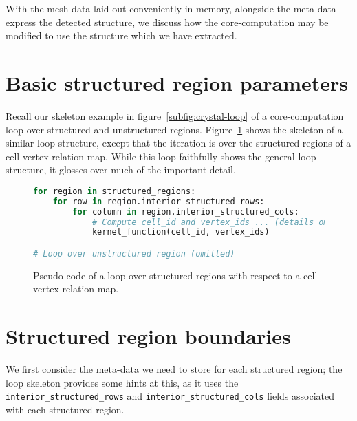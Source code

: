 \label{chap:exploit-structure}

With the mesh data laid out conveniently in memory, alongside the meta-data express the detected structure, we discuss how the core-computation may be modified to use the structure which we have extracted.

\section{Basic structured region parameters}
Recall our skeleton example in figure~\ref{subfig:crystal-loop} of a core-computation loop over structured and unstructured regions. Figure~\ref{fig:skeleton-structured-loop} shows the skeleton of a similar loop structure, except that the iteration is over the structured regions of a cell-vertex relation-map. While this loop faithfully shows the general loop structure, it glosses over much of the important detail.

\begin{figure}
\newsavebox{\thelisting}
\begin{lrbox}{\thelisting}
\begin{lstlisting}[language=python]
for region in structured_regions:
	for row in region.interior_structured_rows:
		for column in region.interior_structured_cols:
			# Compute cell_id and vertex_ids ... (details omitted)
			kernel_function(cell_id, vertex_ids)

# Loop over unstructured region (omitted)
\end{lstlisting}
\end{lrbox}

\usebox{\thelisting}
\caption{Pseudo-code of a loop over structured regions with respect to a cell-vertex relation-map.}
\label{fig:skeleton-structured-loop}
\end{figure}

\section{Structured region boundaries}
We first consider the meta-data we need to store for each structured region; the loop skeleton provides some hints at this, as it uses the \lstinline|interior_structured_rows| and \lstinline|interior_structured_cols| fields associated with each structured region.



